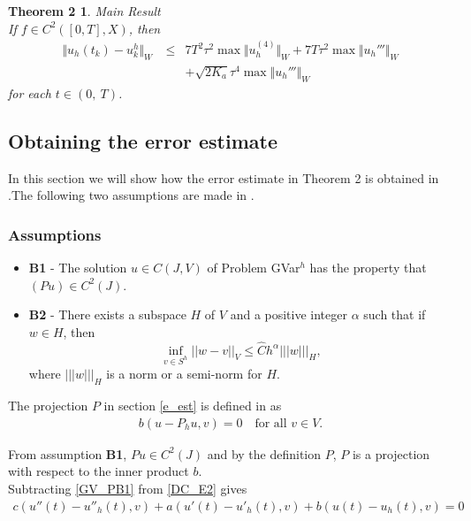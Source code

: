 \documentclass[../../main.tex]{subfiles}
\begin{document}
\newtheorem*{DC_Thm5}{Theorem 2}
\begin{DC_Thm5}
	{Main Result}\\
	If $f\in C^{2}([0,T],X)$, then
	\begin{eqnarray*}
		\Vert u_{h}(t_{k})-u_{k}^{h}\Vert_{W}\ & \leq & 7T^{2}\tau^{2}\max\Vert u_{h}^{(4)}\Vert_{W}+7T\tau^{2}\max\Vert u_{h}'''\Vert_{W}\\
		& & + \sqrt{2K_{a}}\tau^{4}\max\Vert u_{h}'''\Vert_{W}
	\end{eqnarray*}
	for each $t\in(0,\ T)$.
\end{DC_Thm5}

\subsection{Obtaining the error estimate}
In this section we will show how the error estimate in Theorem 2 is obtained in \cite{BV13}.The following two assumptions are made in \cite{BV13}.

\subsubsection*{Assumptions}
\begin{itemize}
	\item[] \textbf{B1} - The solution $u \in C(J,V)$ of Problem GVar$^h$ has the property that $(Pu) \in C^2(J)$.

	\item[] \textbf{B2} - There exists a subspace $H$ of $V$ and a positive integer $\alpha$ such that if $w \in H$, then $$\inf_{v\in S^{h}}||w-v||_V \leq \hat{C} h^\alpha|||w|||_H,$$ where $|||w|||_H$ is a norm or a semi-norm for $H$.
\end{itemize}

The projection $P$ in section \eqref{e_est} is defined in \cite{BV13} as
\begin{eqnarray*}
	b(u-P_hu,v) = 0 \ \ \ \textrm{ for all } v \in V.
\end{eqnarray*}

From assumption \textbf{B1}, $Pu \in C^2(J)$ and by the definition $P$, $P$ is a projection with respect to the inner product $b$.\\

Subtracting \eqref{GV_PB1} from \eqref{DC_E2} gives
\begin{eqnarray*}
	c(u''(t)-u''_h(t),v) + a(u'(t)-u'_h(t),v) + b(u(t)-u_h(t),v) = 0
\end{eqnarray*}
\end{document}
